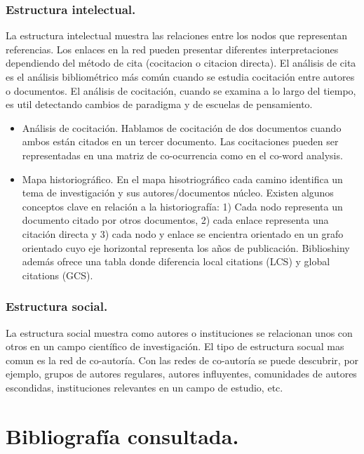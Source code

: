\documentclass[
]{article}
\begin{document}
\hypertarget{estructura-intelectual.-1}{%
\subsubsection{Estructura
intelectual.}\label{estructura-intelectual.-1}}

La estructura intelectual muestra las relaciones entre los nodos que
representan referencias. Los enlaces en la red pueden presentar
diferentes interpretaciones dependiendo del método de cita (cocitacion o
citacion directa). El análisis de cita es el análisis bibliométrico más
común cuando se estudia cocitación entre autores o documentos. El
análisis de cocitación, cuando se examina a lo largo del tiempo, es util
detectando cambios de paradigma y de escuelas de pensamiento.

\begin{itemize}
\item
  Análisis de cocitación. Hablamos de cocitación de dos documentos
  cuando ambos están citados en un tercer documento. Las cocitaciones
  pueden ser representadas en una matriz de co-ocurrencia como en el
  co-word analysis.
\item
  Mapa historiográfico. En el mapa hisotriográfico cada camino
  identifica un tema de investigación y sus autores/documentos núcleo.
  Existen algunos conceptos clave en relación a la historiografía: 1)
  Cada nodo representa un documento citado por otros documentos, 2) cada
  enlace representa una citación directa y 3) cada nodo y enlace se
  encientra orientado en un grafo orientado cuyo eje horizontal
  representa los años de publicación. Biblioshiny además ofrece una
  tabla donde diferencia local citations (LCS) y global citations (GCS).
\end{itemize}

\hypertarget{estructura-social.-1}{%
\subsubsection{Estructura social.}\label{estructura-social.-1}}

La estructura social muestra como autores o instituciones se relacionan
unos con otros en un campo científico de investigación. El tipo de
estructura socual mas comun es la red de co-autoría. Con las redes de
co-autoría se puede descubrir, por ejemplo, grupos de autores regulares,
autores influyentes, comunidades de autores escondidas, instituciones
relevantes en un campo de estudio, etc.

\hypertarget{bibliografuxeda-consultada.}{%
\section*{Bibliografía consultada.}\label{bibliografuxeda-consultada.}}
\end{document}
